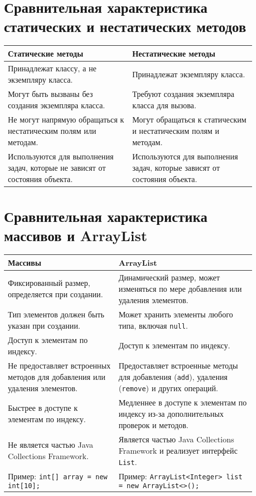 \documentclass[12pt, a4paper]{article}
\begin{document}
\section{Сравнительная характеристика статических и нестатических методов}
\begin{tabular}{|p{6cm}|p{6cm}|}
\hline
\textbf{Статические методы} & \textbf{Нестатические методы} \\
\hline
Принадлежат классу, а не экземпляру класса. & Принадлежат экземпляру класса. \\
\hline
Могут быть вызваны без создания экземпляра класса. & Требуют создания экземпляра класса для вызова. \\
\hline
Не могут напрямую обращаться к нестатическим полям или методам. & Могут обращаться к статическим и нестатическим полям и методам. \\
\hline
Используются для выполнения задач, которые не зависят от состояния объекта. & Используются для выполнения задач, которые зависят от состояния объекта. \\
\hline

\end{tabular}


\section{Сравнительная характеристика массивов и ArrayList}
\begin{tabular}{|p{6cm}|p{6cm}|}
\hline
\textbf{Массивы} & \textbf{ArrayList} \\
\hline
Фиксированный размер, определяется при создании. & Динамический размер, может изменяться по мере добавления или удаления элементов. \\
\hline
Тип элементов должен быть указан при создании. & Может хранить элементы любого типа, включая \texttt{null}. \\
\hline
Доступ к элементам по индексу. & Доступ к элементам по индексу. \\
\hline
Не предоставляет встроенных методов для добавления или удаления элементов. & Предоставляет встроенные методы для добавления (\texttt{add}), удаления (\texttt{remove}) и других операций. \\
\hline
Быстрее в доступе к элементам по индексу. & Медленнее в доступе к элементам по индексу из-за дополнительных проверок и методов. \\
\hline
Не является частью Java Collections Framework. & Является частью Java Collections Framework и реализует интерфейс \texttt{List}. \\
\hline
Пример: \texttt{int[] array = new int[10];} & Пример: \texttt{ArrayList<Integer> list = new ArrayList<>();} \\
\hline
\end{tabular}
\end{document}

